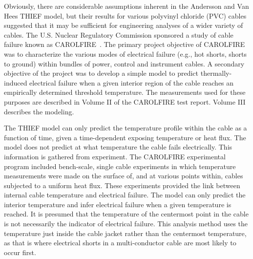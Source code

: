 \documentclass[11pt]{book}
\begin{document}
Obviously, there are considerable assumptions inherent in the Andersson and Van Hees THIEF model, but their results for various polyvinyl chloride (PVC) cables suggested that it may be sufficient for engineering analyses of a wider variety of cables. The U.S. Nuclear Regulatory Commission sponsored a study of cable failure known as CAROLFIRE~\cite{CAROLFIRE}. The primary project objective of CAROLFIRE was to characterize the various modes of electrical failure (e.g., hot shorts, shorts to ground) within bundles of power, control and instrument cables. A secondary objective of the project was to develop a simple model to predict thermally-induced electrical failure when a given interior region of the cable reaches an empirically determined threshold temperature. The measurements used for these purposes are described in Volume II of the CAROLFIRE test report. Volume III describes the modeling.

The THIEF model can only predict the temperature profile within the cable as a function of time, given a time-dependent exposing temperature or heat flux. The model does not predict at what temperature the cable fails electrically. This information is gathered from experiment. The CAROLFIRE experimental program included bench-scale, single cable experiments in which temperature measurements were made on the surface of, and at various points within, cables subjected to a uniform heat flux. These experiments provided the link between internal cable temperature and electrical failure. The model can only predict the interior temperature and infer electrical failure when a given temperature is reached. It is presumed that the temperature of the centermost point in the cable is not necessarily the indicator of electrical failure. This analysis method uses the temperature just inside the cable jacket rather than the centermost temperature, as that is where electrical shorts in a multi-conductor cable are most likely to occur first.
\end{document}
